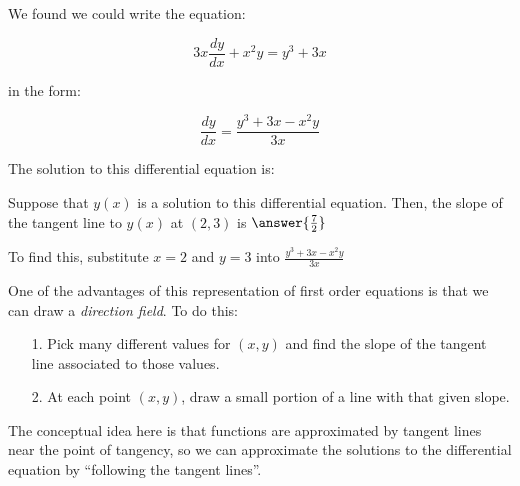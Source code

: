 \documentclass{ximera}
\begin{document}
\begin{exercise}
\begin{exercise}
\begin{image}
  \end{image}

\begin{exercise}
We found we could write the equation:

\[
3x\frac{dy}{dx}+x^2y=y^3+3x
\]

in the form:

\[
\frac{dy}{dx} = \frac{y^3+3x-x^2y}{3x}
\]

The solution to this differential equation is:

\begin{multipleChoice}
\end{multipleChoice}

Suppose that $y(x)$ is a solution to this differential equation.  Then, the slope of the tangent line to $y(x)$ at $(2,3)$ is $\answer{\frac{7}{2}}$

\begin{hint}
To find this, substitute $x=2$ and $y=3$ into $\frac{y^3+3x-x^2y}{3x}$
\end{hint}

One of the advantages of this representation of first order equations is that we can draw a \emph{direction field}.  To do this:

\begin{itemize}
\item[1.] Pick many different values for $(x,y)$ and find the slope of the tangent line associated to those values.
\item[2.] At each point $(x,y)$, draw a small portion of a line with that given slope.
\end{itemize}

The conceptual idea here is that functions are approximated by tangent lines near the point of tangency, so we can approximate the solutions to the differential equation by ``following the tangent lines''.


\end{exercise}
\end{exercise}
\end{exercise}
\end{document}

